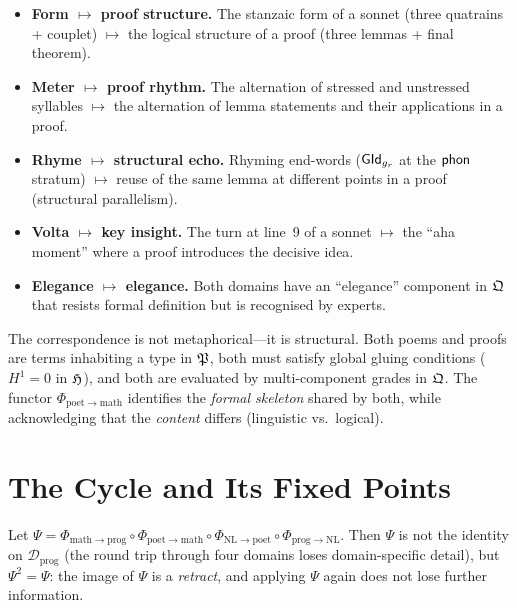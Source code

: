 \begin{construction}
\label{con:poet-math}
\begin{itemize}[nosep]
  \item \textbf{Form $\mapsto$ proof structure.}\quad
    The stanzaic form of a sonnet (three quatrains + couplet)
    $\mapsto$ the logical structure of a proof (three lemmas +
    final theorem).
  \item \textbf{Meter $\mapsto$ proof rhythm.}\quad
    The alternation of stressed and unstressed syllables
    $\mapsto$ the alternation of lemma statements and their
    applications in a proof.
  \item \textbf{Rhyme $\mapsto$ structural echo.}\quad
    Rhyming end-words ($\mathsf{GId}_{g_r}$ at the $\mathsf{phon}$ stratum)
    $\mapsto$ reuse of the same lemma at different points in a
    proof (structural parallelism).
  \item \textbf{Volta $\mapsto$ key insight.}\quad
    The turn at line~9 of a sonnet $\mapsto$ the ``aha moment''
    where a proof introduces the decisive idea.
  \item \textbf{Elegance $\mapsto$ elegance.}\quad
    Both domains have an ``elegance'' component in $\mathfrak{Q}$ that
    resists formal definition but is recognised by experts.
\end{itemize}
\end{construction}

\begin{remark}
The correspondence is not metaphorical---it is structural.
Both poems and proofs are terms inhabiting a type in $\mathfrak{P}$,
both must satisfy global gluing conditions ($H^1=0$ in
$\mathfrak{H}$), and both are evaluated by multi-component grades
in $\mathfrak{Q}$.  The functor $\Phi_{\mathrm{poet}\to\mathrm{math}}$
identifies the \emph{formal skeleton} shared by both, while
acknowledging that the \emph{content} differs (linguistic vs.\
logical).
\end{remark}

\section{The Cycle and Its Fixed Points}
\label{sec:cycle}

\begin{proposition}
\label{prop:cycle-idempotent}
Let $\Psi = \Phi_{\mathrm{math}\to\mathrm{prog}}
            \circ\Phi_{\mathrm{poet}\to\mathrm{math}}
            \circ\Phi_{\mathrm{NL}\to\mathrm{poet}}
            \circ\Phi_{\mathrm{prog}\to\mathrm{NL}}$.
Then $\Psi$ is not the identity on $\mathcal{D}_{\mathrm{prog}}$
(the round trip through four domains loses domain-specific
detail), but $\Psi^2=\Psi$: the image of $\Psi$ is a
\emph{retract}, and applying $\Psi$ again does not lose further
information.
\end{proposition}

